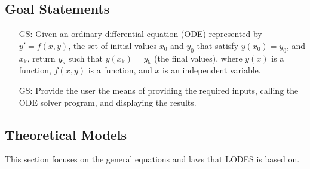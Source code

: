\documentclass[12pt]{article}
\newcounter{goalnum} %
\newcommand{\progname}{LODES} %
\begin{document}
\subsection{Goal Statements} \label{Sec_gs}

\begin{itemize}

\item[GS\refstepcounter{goalnum}\thegoalnum \label{G_1}:]{
Given an ordinary differential equation (ODE) represented by $y'= f(x,y)$, the set of initial values
$x_\text{0}$ and $y_\text{0}$ that satisfy $y(x_\text{0}) = y_\text{0}$, and $x_\text{k}$, return $y_\text{k}$
such that $y(x_\text{k}) = y_\text{k}$ (the final values), where $y(x)$ is a function, $f(x,y)$ is a function,
and $x$ is an independent variable.}

\item[GS\refstepcounter{goalnum}\thegoalnum \label{G_2}:]{
Provide the user the means of providing the required inputs, calling the ODE solver program, and displaying the results.
}

\end{itemize}

\subsection{Theoretical Models}\label{sec_theoretical}

This section focuses on the general equations and laws that \progname{} is based
on.

~\newline
\end{document}
